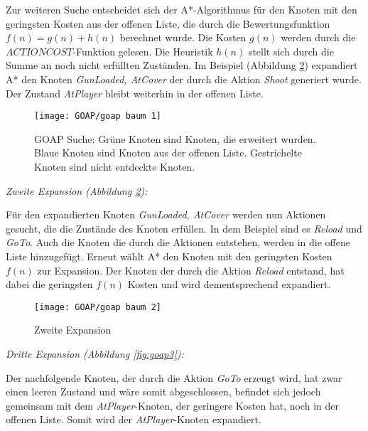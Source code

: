 Zur weiteren Suche entscheidet sich der A*-Algorithmus f\"{u}r den Knoten mit den geringsten Kosten aus der offenen Liste, die durch die Bewertungsfunktion $f(n) = g(n) + h(n)$ berechnet wurde. Die Kosten $g(n)$ werden durch die $\textit{ACTIONCOST}$-Funktion gelesen. Die Heuristik $h(n)$ stellt sich durch die Summe an noch nicht erf\"{u}llten Zust\"{a}nden. Im Beispiel (Abbildung \ref{fig:goap2}) expandiert A* den Knoten \textit{GunLoaded, AtCover} der durch die Aktion \textit{Shoot} generiert wurde. Der Zustand \textit{AtPlayer} bleibt weiterhin in der offenen Liste.


\begin{figure}[h]
  \centering
  \texttt{[image: GOAP/goap baum 1]}
	\captionsetup{justification=justified, format=plain}
  \caption{GOAP Suche: Gr\"{u}ne Knoten sind Knoten, die erweitert wurden. Blaue Knoten sind Knoten aus der offenen Liste. Gestrichelte Knoten sind nicht entdeckte Knoten.}
  \label{fig:goap1}
\end{figure}

\clearpage

\textit{Zweite Expansion (Abbildung \ref{fig:goap2}):}

F\"{u}r den expandierten Knoten \textit{GunLoaded, AtCover} werden nun Aktionen gesucht, die die Zust\"{a}nde des Knoten erf\"{u}llen. In dem Beispiel sind es \textit{Reload} und \textit{GoTo}. Auch die Knoten die durch die Aktionen entstehen, werden in die offene Liste hinzugef\"{u}gt. Erneut w\"{a}hlt A* den Knoten mit den geringsten Kosten $f(n)$ zur Expansion. Der Knoten der durch die Aktion \textit{Reload} entstand, hat dabei die geringsten $f(n)$ Kosten und wird dementsprechend expandiert. 


\begin{figure}[ht]
  \centering
  \texttt{[image: GOAP/goap baum 2]}
	\captionsetup{justification=justified, format=plain}
  \caption{Zweite Expansion}
  \label{fig:goap2}
\end{figure}


\clearpage

\textit{Dritte Expansion (Abbildung \ref{fig:goap3}):}

Der nachfolgende Knoten, der durch die Aktion \textit{GoTo} erzeugt wird, hat zwar einen leeren Zustand und w\"{a}re somit abgeschlossen, befindet sich jedoch gemeinsam mit dem \textit{AtPlayer}-Knoten, der geringere Kosten hat, noch in der offenen Liste. Somit wird der \textit{AtPlayer}-Knoten expandiert.

